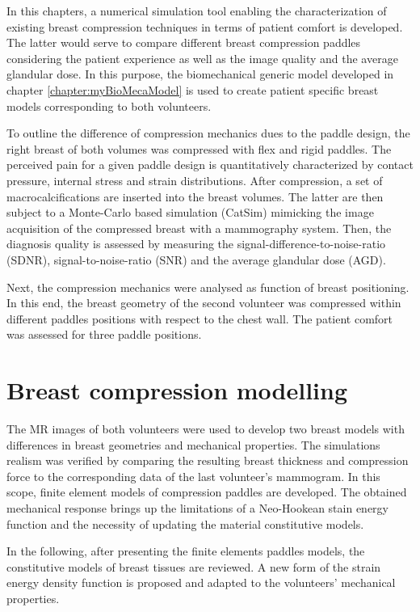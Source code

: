 
In this chapters, a numerical simulation tool enabling the characterization of existing breast compression techniques in terms of patient comfort is developed. The latter would serve to compare different breast compression paddles considering the patient experience as well as the image quality and the average glandular dose. In this purpose, the biomechanical generic model developed in chapter \ref{chapter:myBioMecaModel} is used to create patient specific breast models corresponding to both volunteers. 

To outline the difference of compression mechanics dues to the paddle design, the right breast of both volumes was compressed with flex and rigid paddles. The perceived pain for a given paddle design is quantitatively characterized by contact pressure, internal stress and strain distributions. After compression, a set of macrocalcifications are inserted into the breast volumes. The latter are then subject to a Monte-Carlo based simulation (CatSim) mimicking the image acquisition of the compressed breast with a mammography system. Then, the diagnosis quality is assessed by measuring the signal-difference-to-noise-ratio (SDNR), signal-to-noise-ratio (SNR) and the average glandular dose (AGD).


Next, the compression mechanics were analysed as function of breast positioning. In this end, the breast geometry of the second volunteer was compressed within different paddles positions with respect to the chest wall. The patient comfort was assessed for three paddle positions. 

 

\clearpage


\section{Breast compression modelling}
The MR images of both volunteers were used to develop two breast models with differences in breast geometries and mechanical properties. The simulations realism was verified by comparing the resulting breast thickness and compression force to the corresponding data of the last volunteer's mammogram.  In this scope, finite element models of compression paddles are developed. The obtained mechanical response brings up the limitations of a Neo-Hookean stain energy function and the necessity of updating the material constitutive models. 

In the following, after presenting the finite elements paddles models, the constitutive models of breast tissues are reviewed. A new form of the strain energy density function is proposed and adapted to the volunteers’ mechanical properties.   

